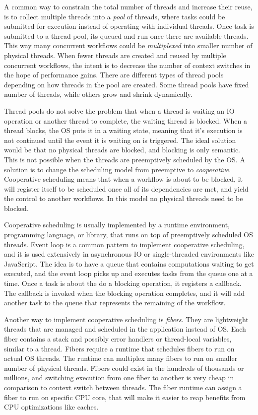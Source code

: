 A common way to constrain the total number of threads and increase their reuse, is to collect multiple threads into a \textit{pool} of threads, where tasks could be submitted for execution instead of operating with individual threads. Once task is submitted to a thread pool, its queued and run once there are available threads. This way many concurrent workflows could be \textit{multiplexed} into smaller number of physical threads. When fewer threads are created and reused by multiple concurrent workflows, the intent is to decrease the number of context switches in the hope of performance gains. There are different types of thread pools depending on how threads in the pool are created. Some thread pools have fixed number of threads, while others grow and shrink dynamically.

Thread pools do not solve the problem that when a thread is waiting an IO operation or another thread to complete, the waiting thread is blocked. When a thread blocks, the OS puts it in a waiting state, meaning that it's execution is not continued until the event it is waiting on is triggered. The ideal solution would be that no physical threads are blocked, and blocking is only semantic. This is not possible when the threads are preemptively scheduled by the OS. A solution is to change the scheduling model from preemptive to \textit{cooperative}. Cooperative scheduling means that when a workflow is about to be blocked, it will register itself to be scheduled once all of its dependencies are met, and yield the control to another workflows. In this model no physical threads need to be blocked.

Cooperative scheduling is usually implemented by a runtime environment, programming language, or library, that runs on top of preemptively scheduled OS threads. Event loop is a common pattern to implement cooperative scheduling, and it is used extensively in asynchronous IO or single-threaded environments like JavaScript. The idea is to have a queue that contains computations waiting to get executed, and the event loop picks up and executes tasks from the queue one at a time. Once a task is about the do a blocking operation, it registers a callback. The callback is invoked when the blocking operation completes, and it will add another task to the queue that represents the remaining of the workflow.

Another way to implement cooperative scheduling is \textit{fibers}. They are lightweight threads that are managed and scheduled in the application instead of OS. Each fiber contains a stack and possibly error handlers or thread-local variables, similar to a thread. Fibers require a runtime that schedules fibers to run on actual OS threads. The runtime can multiplex many fibers to run on smaller number of physical threads. Fibers could exist in the hundreds of thousands or millions, and switching execution from one fiber to another is very cheap in comparison to context switch between threads. The fiber runtime can assign a fiber to run on specific CPU core, that will make it easier to reap benefits from CPU optimizations like caches.


